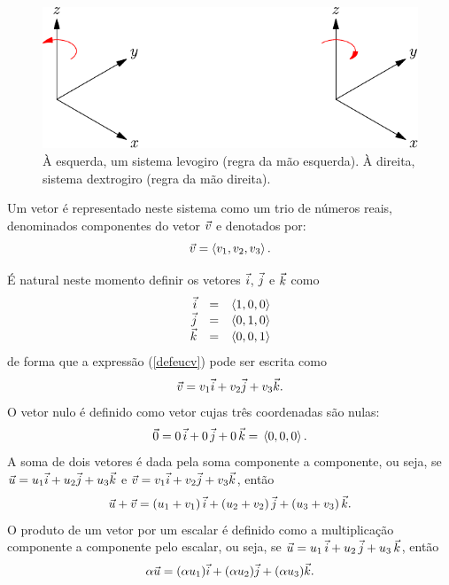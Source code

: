 \begin{figure}\begin{center}
 \includegraphics{./cap_algvet/pics/eixos_levo_destro}
      \caption{À esquerda, um sistema levogiro (regra da mão esquerda). À direita, sistema dextrogiro (regra da mão direita).}
      \label{fig:marginfig}
  \end{center}
  \end{figure}
 
 Um vetor é representado neste sistema como um trio de números reais, denominados componentes do vetor $\vec{v}$ e denotados por: 
\begin{equation}\label{defeucv}\vec{v}=\left<v_1,v_2,v_3\right>.\end{equation}
  
É natural neste momento definir os vetores $\vec{i}$, $\vec{j}$ e $\vec{k}$ como
\begin{equation}\label{defijk}
\begin{array}{rcl}
\vec{i}&=&\left<1,0,0\right>\\
\vec{j}&=&\left<0,1,0\right>\\
\vec{k}&=&\left<0,0,1\right>
\end{array}
\end{equation}
de forma que a expressão (\ref{defeucv}) pode ser escrita como
\begin{equation}\label{repijk}\vec{v}=v_1  \vec{i}+v_2  \vec{j}+v_3 \vec{k}.\end{equation}
O vetor nulo é definido como vetor cujas três coordenadas são nulas:
\begin{equation}\label{defnulo}\vec{0}=0 ~\! \vec{i}+0~\!  \vec{j}+0~\!  \vec{k}= ~\!\left<0,0,0\right>.\end{equation}
A soma de dois vetores é dada pela soma componente a componente, ou seja, se $\vec{u}=u_1  \vec{i}+u_2\vec{j}+u_3 \vec{k}$ e $\vec{v}=v_1\vec{i}+v_2\vec{j}+v_3 \vec{k}$, então
\begin{equation}\label{defsoma}\vec{u}+\vec{v}= \left(u_1+v_1\right) \vec{i}+\left(u_2+v_2\right) \vec{j}+\left(u_3+v_3\right) \vec{k}.\end{equation}
O produto de um vetor por um escalar é definido como a multiplicação componente a componente pelo escalar, ou seja, se $\vec{u}=u_1~\!  \vec{i}+u_2~\!  \vec{j}+u_3 ~\! \vec{k}$, então
\begin{equation}\label{defprod}\alpha\vec{u}=(\alpha u_1)\vec{i}+(\alpha u_2)\vec{j}+(\alpha u_3) \vec{k} .\end{equation}

